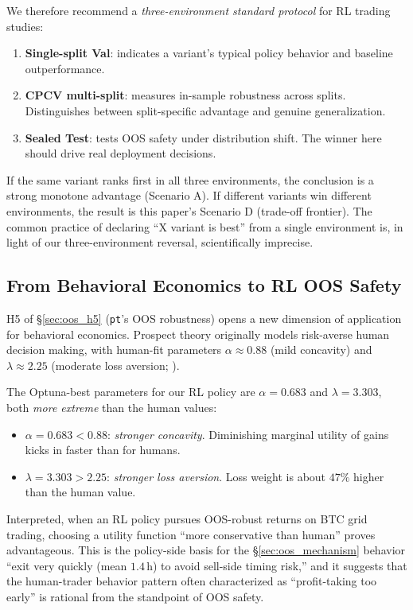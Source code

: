 \documentclass[11pt, a4paper]{article}
\begin{document}
We therefore recommend a \emph{three-environment standard protocol} for RL
trading studies:
\begin{enumerate}[leftmargin=*]
\item \textbf{Single-split Val}: indicates a variant's typical policy
behavior and baseline outperformance.
\item \textbf{CPCV multi-split}: measures in-sample robustness across
splits. Distinguishes between split-specific advantage and genuine
generalization.
\item \textbf{Sealed Test}: tests OOS safety under distribution shift. The
winner here should drive real deployment decisions.
\end{enumerate}

If the same variant ranks first in all three environments, the conclusion is
a strong monotone advantage (Scenario A). If different variants win
different environments, the result is this paper's Scenario D
(trade-off frontier). The common practice of declaring ``X variant is best''
from a single environment is, in light of our three-environment reversal,
scientifically imprecise.

\subsection{From Behavioral Economics to RL OOS Safety}
\label{sec:disc_pt_safety}

H5 of \S\ref{sec:oos_h5} (\texttt{pt}'s OOS robustness) opens a new
dimension of application for behavioral economics. Prospect theory
\citep{kahneman1979prospect} originally models risk-averse human decision
making, with human-fit parameters $\alpha \approx 0.88$ (mild concavity)
and $\lambda \approx 2.25$ (moderate loss aversion;
\citealt{tversky1992cumulative}).

The Optuna-best parameters for our RL policy are $\alpha = 0.683$ and
$\lambda = 3.303$, both \emph{more extreme} than the human values:
\begin{itemize}[leftmargin=*]
\item $\alpha = 0.683 < 0.88$: \emph{stronger concavity}. Diminishing
marginal utility of gains kicks in faster than for humans.
\item $\lambda = 3.303 > 2.25$: \emph{stronger loss aversion}. Loss weight
is about $47\%$ higher than the human value.
\end{itemize}

Interpreted, when an RL policy pursues OOS-robust returns on BTC grid
trading, choosing a utility function ``more conservative than human''
proves advantageous. This is the policy-side basis for the
\S\ref{sec:oos_mechanism} behavior ``exit very quickly (mean $1.4$\,h) to
avoid sell-side timing risk,'' and it suggests that the human-trader
behavior pattern often characterized as ``profit-taking too early'' is
rational from the standpoint of OOS safety.
\end{document}
